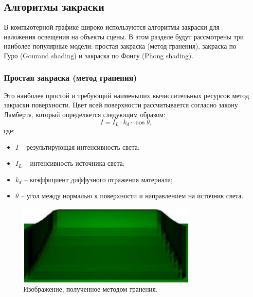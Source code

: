 \subsection{Алгоритмы закраски}


\hspace{1.25cm}
В компьютерной графике широко используются алгоритмы закраски для наложения освещения на объекты сцены. В этом разделе будут рассмотрены три наиболее популярные модели: простая закраска (метод гранения), закраска по Гуро (Gouraud shading) и закраска по Фонгу (Phong shading).


\subsubsection{Простая закраска (метод гранения)}

\hspace{1.25cm}
Это наиболее простой и требующий наименьших вычислительных ресурсов метод закраски поверхности. Цвет всей поверхности рассчитывается согласно закону Ламберта, который определяется следующим образом:
\begin{equation}
I = I_L \cdot k_d \cdot \cos\theta,
\end{equation}
где:
\begin{itemize}[label=--]
    \item \( I \) -- результирующая интенсивность света;
    \item \( I_L \) -- интенсивность источника света;
    \item \( k_d \) -- коэффициент диффузного отражения материала;
    \item \( \theta \) -- угол между нормалью к поверхности и направлением на источник света.
\end{itemize}

\begin{figure}[h!]
    \centering
    \includegraphics[width=0.8\textwidth]{img/granulation_example.png}
    \caption{Изображение, полученное методом гранения.}
    \label{fig:granulation}
\end{figure}

